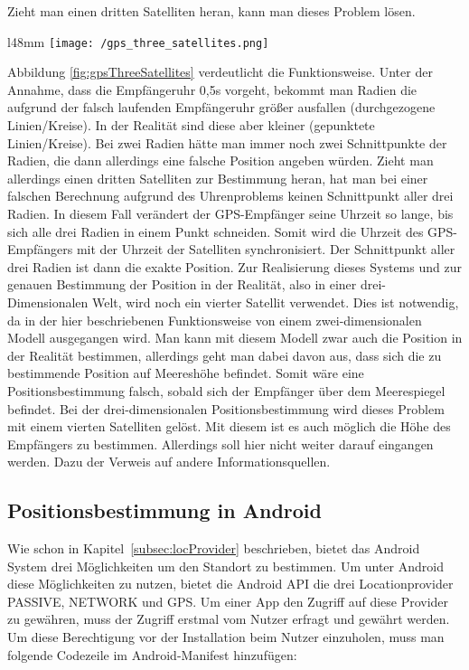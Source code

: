 Zieht man einen dritten Satelliten heran, kann man dieses Problem lösen. 
\begin{wrapfigure}{l}{48mm}
	\centering
	\texttt{[image: /gps\_three\_satellites.png]}
	\caption[Lokalisierung: GPS 3 Satelliten]{GPS 3 Satellites}
	\label{fig:gpsThreeSatellites}
\end{wrapfigure}
Abbildung \ref{fig:gpsThreeSatellites} verdeutlicht die Funktionsweise. Unter der Annahme, dass die Empfängeruhr 0,5s vorgeht, bekommt man Radien die aufgrund der falsch laufenden Empfängeruhr größer ausfallen (durchgezogene Linien/Kreise). In der Realität sind diese aber kleiner (gepunktete Linien/Kreise). Bei zwei Radien hätte man immer noch zwei Schnittpunkte der Radien, die dann allerdings eine falsche Position angeben würden. Zieht man allerdings einen dritten Satelliten zur Bestimmung heran, hat man bei einer falschen Berechnung aufgrund des Uhrenproblems keinen Schnittpunkt aller drei Radien. In diesem Fall verändert der GPS-Empfänger seine Uhrzeit so lange, bis sich alle drei Radien in einem Punkt schneiden. Somit wird die Uhrzeit des GPS-Empfängers mit der Uhrzeit der Satelliten synchronisiert. Der Schnittpunkt aller drei Radien ist dann die exakte Position.
Zur Realisierung dieses Systems und zur genauen Bestimmung der Position in der Realität, also in einer drei-Dimensionalen Welt, wird noch ein vierter Satellit verwendet. Dies ist notwendig, da in der hier beschriebenen Funktionsweise von einem zwei-dimensionalen Modell ausgegangen wird. Man kann mit diesem Modell zwar auch die Position in der Realität bestimmen, allerdings geht man dabei davon aus, dass sich die zu bestimmende Position auf Meereshöhe befindet. Somit wäre eine Positionsbestimmung falsch, sobald sich der Empfänger über dem Meerespiegel befindet.
Bei der drei-dimensionalen Positionsbestimmung wird dieses Problem mit einem vierten Satelliten gelöst. Mit diesem ist es auch möglich die Höhe des Empfängers zu bestimmen. Allerdings soll hier nicht weiter darauf eingangen werden. Dazu der Verweis auf andere Informationsquellen.

\subsection{Positionsbestimmung in Android}\label{subsec:posInAndroid}

Wie schon in Kapitel~\ref{subsec:locProvider} beschrieben, bietet das Android System drei Möglichkeiten um den Standort zu bestimmen. Um unter Android diese Möglichkeiten zu nutzen, bietet die Android API die drei Locationprovider PASSIVE, NETWORK und GPS.
Um einer App den Zugriff auf diese Provider zu gewähren, muss der Zugriff erstmal vom Nutzer erfragt und gewährt werden. Um diese Berechtigung vor der Installation beim Nutzer einzuholen, muss man folgende Codezeile im Android-Manifest hinzufügen:

